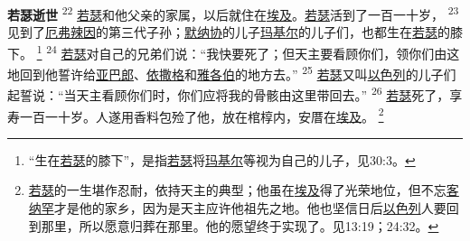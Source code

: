 \textbf{若瑟逝世\quad}
\textsuperscript{22}
\uline{若瑟}和他父亲的家属，以后就住在\uline{埃及}。\uline{若瑟}活到了一百一十岁，
\textsuperscript{23}
见到了\uline{厄弗辣因}的第三代子孙；\uline{默纳协}的儿子\uline{玛基尔}的儿子们，也都生在\uline{若瑟}的膝下。
\footnote{“生在\uline{若瑟}的膝下”，是指\uline{若瑟}将\uline{玛基尔}等视为自己的儿子，见30:3。}
\textsuperscript{24}
\uline{若瑟}对自己的兄弟们说：“我快要死了；但天主要看顾你们，领你们由这地回到他誓许给\uline{亚巴郎}、\uline{依撒格}和\uline{雅各伯}的地方去。”
\textsuperscript{25}
\uline{若瑟}又叫\uline{以色列}的儿子们起誓说：“当天主看顾你们时，你们应将我的骨骸由这里带回去。”
\textsuperscript{26}
\uline{若瑟}死了，享寿一百一十岁。人遂用香料包殓了他，放在棺椁内，安厝在\uline{埃及}。
\footnote{\uline{若瑟}的一生堪作忍耐，依持天主的典型；他虽在\uline{埃及}得了光荣地位，但不忘\uline{客纳罕}才是他的家乡，因为是天主应许他祖先之地。他也坚信日后\uline{以色列}人要回到那里，所以愿意归葬在那里。他的愿望终于实现了。见13:19；24:32。}
